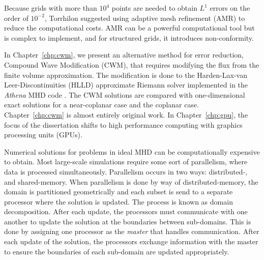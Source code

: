 Because grids with more than $10^4$ points are needed to obtain $L^1$ errors on the order of $10^{-2}$, Torrhilon \citep{Torrilhon:2003b} suggested using adaptive mesh refinement (AMR) to reduce the computational costs.  AMR can be a powerful computational tool but is complex to implement, and for structured grids, it introduces non-conformity.  

In Chapter~\ref{chp:cwm}, we present an alternative method for error reduction, Compound Wave Modification (CWM), that requires modifying the flux from the finite volume approximation.  The modification is done to the Harden-Lax-van Leer-Discontinuities (HLLD) \citep{Miyoshi:2005} approximate Riemann solver implemented in the \emph{Athena} MHD code \citep{Stone:2008,url:athena}.  The CWM solutions are compared with one-dimensional exact solutions for a near-coplanar case and the coplanar case.  Chapter~\ref{chp:cwm} is almost entirely original work.  In Chapter~\ref{chp:gpu}, the focus of the dissertation shifts to high performance computing with graphics processing units (GPUs).

Numerical solutions for problems in ideal MHD can be computationally expensive to obtain.  Most large-scale simulations require some sort of parallelism, where data is processed simultaneously.  Parallelism occurs in two ways: distributed-, and shared-memory.  When parallelism is done by way of distributed-memory, the domain is partitioned geometrically and each subset is send to a separate processor where the solution is updated.  The process is known as domain decomposition.   After each update, the processors must communicate with one another to update the solution at the boundaries between sub-domains.  This is done by assigning one processor as the \emph{master} that handles communication.  After each update of the solution, the processors exchange information with the master to ensure the boundaries of each sub-domain are updated appropriately.

